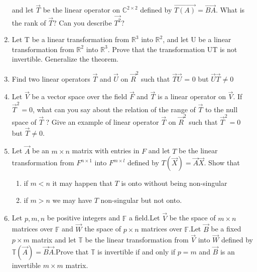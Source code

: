 \begin{enumerate}[label=\thesubsection.\arabic*.,ref=\thesubsection.\theenumi]
and let $\vec{T}$ be the linear operator on $\mathbb{C}^{2\times2}$  defined by $\vec{T(A)} = \vec{BA}$. What is the rank of $\vec{T}$? Can you describe $\vec{T^2}$?   
%
\\
\solution

%
\item Let T be a linear transformation from $\mathbb{R}^3$ into $\mathbb{R}^2$, and let U be a linear transformation from $\mathbb{R}^2$ into $\mathbb{R}^3$. Prove that the transformation UT is not invertible. Generalize the theorem.
%
\\
\solution

%
\item Find two linear operators $\vec{T}$ and $\vec{U}$ on $\vec{R}^2$ such that $\vec{T}\vec{U}$ = 0 but $\vec{U}\vec{T} \neq 0$
%
\\
\solution

%
\item Let $\vec{V}$ be a vector space over the field $\vec{F}$ and $\vec{T}$ is a linear operator on $\vec{V}$. If $\vec{T}^2=0$, what can you say about the relation of the range of $\vec{T}$ to the null space of $\vec{T}$ ?
Give an example of linear operator $\vec{T}$ on $\vec{R}^2$ such that $\vec{T}^2=0$ but $\vec{T}\ne0$.
%
\\
\solution


%
\item Let $\vec{A}$ be an $m \times n$ matrix with entries in $F$ and let $T$ be the linear transformation from $F^{n \times1 }$ into $F^{m \times l}$ defined by $T(\vec{X}) = \vec{A}\vec{X}$. Show that 
\begin{enumerate}
\item
if $m < n$ it may happen that $T$ is onto without being non-singular
\item
if $m>n$ we may have $T$ non-singular but not onto.
\\
\end{enumerate}
%
\solution

%
\item Let $p,m,n$ be positive integers and $\mathbb{F}$ a field.Let $\vec{V}$ be the space of $m \times n$ matrices over $\mathbb{F}$ and $\vec{W}$ the space of $p \times n$ matrices over $\mathbb{F}$.Let $\vec{B}$ be a fixed $p \times m$ matrix and let $\mathbb{T}$ be the linear transformation from $\vec{V}$ into $\vec{W}$ defined by $\mathbb{T}(\vec{A})=\vec{B}\vec{A}$.Prove that $\mathbb{T}$ is invertible if and only if $p=m$ and $\vec{B}$ is an invertible $m \times m$ matrix. 
%
\solution


\end{enumerate}
